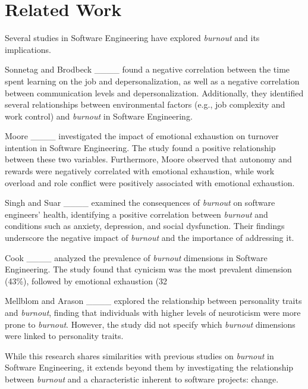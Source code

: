\section{Related Work}
Several studies in Software Engineering have explored \textit{burnout} and its implications.

Sonnetag and Brodbeck ____ found a negative correlation between the time spent learning on the job and depersonalization, as well as a negative correlation between communication levels and depersonalization. Additionally, they identified several relationships between environmental factors (e.g., job complexity and work control) and \textit{burnout} in Software Engineering.

Moore ____ investigated the impact of emotional exhaustion on turnover intention in Software Engineering. The study found a positive relationship between these two variables. Furthermore, Moore observed that autonomy and rewards were negatively correlated with emotional exhaustion, while work overload and role conflict were positively associated with emotional exhaustion.

Singh and Suar ____ examined the consequences of \textit{burnout} on software engineers’ health, identifying a positive correlation between \textit{burnout} and conditions such as anxiety, depression, and social dysfunction. Their findings underscore the negative impact of \textit{burnout} and the importance of addressing it.

Cook ____ analyzed the prevalence of \textit{burnout} dimensions in Software Engineering. The study found that cynicism was the most prevalent dimension (43\%), followed by emotional exhaustion (32%

Mellblom and Arason ____ explored the relationship between personality traits and \textit{burnout}, finding that individuals with higher levels of neuroticism were more prone to \textit{burnout}. However, the study did not specify which \textit{burnout} dimensions were linked to personality traits.

While this research shares similarities with previous studies on \textit{burnout} in Software Engineering, it extends beyond them by investigating the relationship between \textit{burnout} and a characteristic inherent to software projects: change.